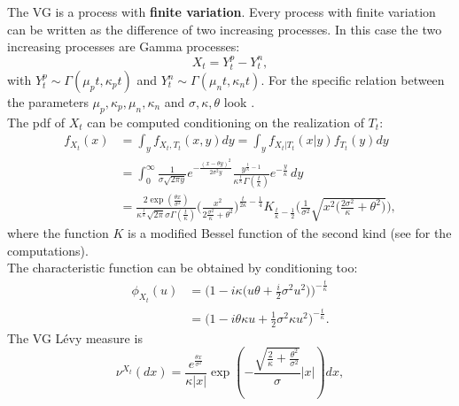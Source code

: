 The VG is a process with \textbf{finite variation}. Every process with finite variation can be written as the difference of two increasing 
processes. In this case the two increasing processes are Gamma processes:
\begin{equation}
 X_t = Y^p_t - Y^n_t,
\end{equation}
with $Y^p_t \sim \Gamma(\mu_p t, \kappa_p t)$ and $Y^n_t \sim \Gamma(\mu_n t, \kappa_n t)$. For the specific relation between the parameters
$\mu_p,\kappa_p,\mu_n,\kappa_n$ and $\sigma,\kappa,\theta$ look \cite{MCC98}.\\
\newline
The pdf of $X_t$ can be computed conditioning on the realization of $T_t$:
\begin{align}\label{VG_density}
 f_{X_t}(x) &= \int_y f_{X_t,T_t}(x,y) dy = \int_y f_{X_t|T_t}(x|y) f_{T_t}(y) dy \\ \nonumber
         &= \int_0^{\infty} \frac{1}{\sigma \sqrt{2\pi y}} e^{-\frac{(x -\theta y)^2}{2\sigma^2 y}}
         \frac{y^{\frac{t}{\kappa} -1}}{\kappa^{\frac{t}{\kappa}} \Gamma(\frac{t}{\kappa})}
          e^{-\frac{y}{\kappa}} \, dy \\ \nonumber
         &= \frac{2 \exp(\frac{\theta x}{\sigma^2})}{\kappa^{\frac{t}{\kappa}} \sqrt{2\pi}\sigma \Gamma(\frac{t}{\kappa}) }
            \biggl( \frac{x^2}{2\frac{\sigma^2}{\kappa} + \theta^2} \biggr)^{\frac{t}{2\kappa}-\frac{1}{4}} 
            K_{\frac{t}{\kappa}-\frac{1}{2}} 
            \biggl( \frac{1}{\sigma^2} \sqrt{x^2 \bigl(\frac{2\sigma^2}{\kappa}+\theta^2 \bigr)} \biggr),
\end{align}
where the function $K$ is a modified Bessel function of the second kind (see \cite{MCC98} for the computations).\\
The characteristic function can be obtained by conditioning too: 
\begin{align*}
 \phi_{X_t}(u) &= \biggl( 1-i \kappa \bigl( u\theta +\frac{i}{2}\sigma^2 u^2 \bigr) \biggr)^{-\frac{t}{\kappa}} \\  
	       &= \biggl( 1-i\theta \kappa u + \frac{1}{2} \sigma^2 \kappa u^2 \biggr)^{-\frac{t}{\kappa}}.
\end{align*}
\newline
The VG Lévy measure is
\begin{equation}\label{VG_measure}
 \nu^{X_t}(dx) = \frac{e^{\frac{\theta x}{\sigma^2}}}{\kappa|x|} \exp 
 \left( - \frac{\sqrt{\frac{2}{\kappa} + \frac{\theta^2}{\sigma^2}}}{\sigma} |x|\right) dx,
\end{equation}
